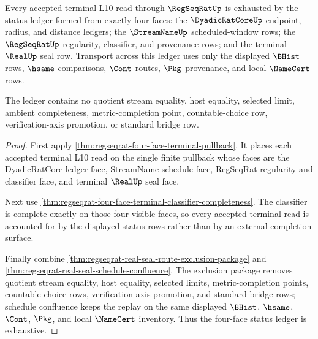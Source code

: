 \begin{theorem}
\label{thm:regseqrat-dyadic-tail-real-seal-status-exhaustion}
Every accepted terminal L10 read through $\RegSeqRatUp$ is exhausted by the
status ledger formed from exactly four faces: the $\DyadicRatCoreUp$ endpoint,
radius, and distance ledgers; the $\StreamNameUp$ scheduled-window rows; the
$\RegSeqRatUp$ regularity, classifier, and provenance rows; and the terminal
$\RealUp$ seal row. Transport across this ledger uses only the displayed
$\BHist$ rows, $\hsame$ comparisons, $\Cont$ routes, $\Pkg$ provenance, and
local $\NameCert$ rows.

The ledger contains no quotient stream equality, host equality, selected
limit, ambient completeness, metric-completion point, countable-choice row,
verification-axis promotion, or standard bridge row.
\end{theorem}
\begin{proof}
First apply \autoref{thm:regseqrat-four-face-terminal-pullback}. It places
each accepted terminal L10 read on the single finite pullback whose faces are
the DyadicRatCore ledger face, StreamName schedule face, RegSeqRat regularity
and classifier face, and terminal $\RealUp$ seal face.

Next use \autoref{thm:regseqrat-four-face-terminal-classifier-completeness}.
The classifier is complete exactly on those four visible faces, so every
accepted terminal read is accounted for by the displayed status rows rather
than by an external completion surface.

Finally combine \autoref{thm:regseqrat-real-seal-route-exclusion-package} and
\autoref{thm:regseqrat-real-seal-schedule-confluence}. The exclusion package
removes quotient stream equality, host equality, selected limits,
metric-completion points, countable-choice rows, verification-axis promotion,
and standard bridge rows; schedule confluence keeps the replay on the same
displayed $\BHist$, $\hsame$, $\Cont$, $\Pkg$, and local $\NameCert$ inventory.
Thus the four-face status ledger is exhaustive.
\end{proof}
